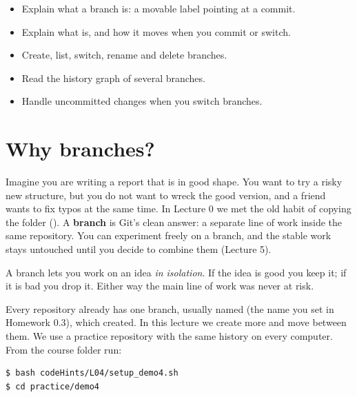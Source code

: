 


\begin{goals}
\begin{itemize}
  \item Explain what a branch is: a movable label pointing at a commit.
  \item Explain what  is, and how it moves when you commit or switch.
  \item Create, list, switch, rename and delete branches.
  \item Read the history graph of several branches.
  \item Handle uncommitted changes when you switch branches.
\end{itemize}
\end{goals}

\section{Why branches?}

Imagine you are writing a report that is in good shape. You want to try a risky new structure, but you do not want to wreck the good version, and a friend wants to fix typos at the same time. In Lecture 0 we met the old habit of copying the folder (). A \textbf{branch} is Git's clean answer: a separate line of work inside the same repository. You can experiment freely on a branch, and the stable work stays untouched until you decide to combine them (Lecture 5).

\begin{keyidea}
A branch lets you work on an idea \emph{in isolation}. If the idea is good you keep it; if it is bad you drop it. Either way the main line of work was never at risk.
\end{keyidea}

Every repository already has one branch, usually named  (the name you set in Homework 0.3), which  created. In this lecture we create more and move between them. We use a practice repository with the same history on every computer. From the course folder run:

\begin{lstlisting}
$ bash codeHints/L04/setup_demo4.sh
$ cd practice/demo4
\end{lstlisting}


